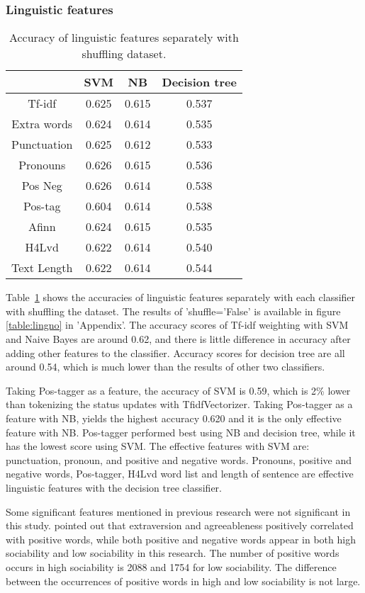 \documentclass[
10pt, %
a4paper, %
oneside, %
headinclude,footinclude, %
] {book}%
\begin{document}
\subsubsection{Linguistic features}
\begin{table}[hbtp]\centering
\caption{Accuracy of linguistic features separately with shuffling dataset.\label{table:lingse}}
\begin{tabular}{|cccc|}
\hline
 & SVM & NB & Decision tree\\
\hline
Tf-idf & 0.625 & 0.615 & 0.537\\
Extra words & 0.624 & 0.614 & 0.535\\
Punctuation & 0.625 & 0.612 & 0.533\\
Pronouns & 0.626 & 0.615 & 0.536\\
Pos Neg & 0.626 & 0.614 & 0.538\\
Pos-tag & 0.604 & 0.614 & 0.538\\
Afinn & 0.624 & 0.615 & 0.535\\
H4Lvd & 0.622 & 0.614 & 0.540\\
Text Length & 0.622 & 0.614 & 0.544\\
\hline
\end{tabular}
\end{table}
Table~\ref{table:lingse} shows the accuracies of linguistic features separately with each classifier with shuffling the dataset. The results of 'shuffle='False' is available in figure \ref{table:lingno} in 'Appendix'. The accuracy scores of Tf-idf weighting with SVM and Naive Bayes are around 0.62, and there is little difference in accuracy after adding other features to the classifier. Accuracy scores for decision tree are all around 0.54, which is much lower than the results of other two classifiers.  

Taking Pos-tagger as a feature, the accuracy of SVM is 0.59, which is 2\% lower than tokenizing the status updates with TfidfVectorizer. Taking Pos-tagger as a feature with NB, yields the highest accuracy 0.620 and it is the only effective feature with NB. Pos-tagger performed best using NB and decision tree, while it has the lowest score using SVM. The effective features with SVM are: punctuation, pronoun, and positive and negative words. Pronouns, positive and negative words, Pos-tagger, H4Lvd word list and length of sentence are effective linguistic features with the decision tree classifier.

Some significant features mentioned in previous research were not significant in this study. \citet{pennebaker1999linguistic} pointed out that extraversion and agreeableness positively correlated with positive words, while both positive and negative words appear in both high sociability and low sociability in this research. The number of positive words occurs in high sociability is 2088 and 1754 for low sociability. The difference between the occurrences of positive words in high and low sociability is not large.
\end{document}
